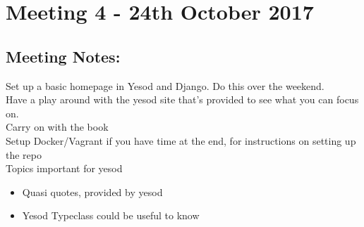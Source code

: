 \section{Meeting 4 - 24th October 2017}

\subsection{Meeting Notes:}

Set up a basic homepage in Yesod and Django. Do this over the weekend.\\
Have a play around with the yesod site that’s provided to see what you can focus on.\\
Carry on with the book\\
Setup Docker/Vagrant if you have time at the end, for instructions on setting up the repo\\
Topics important for yesod
\begin{itemize}
  \item Quasi quotes, provided by yesod
  \item Yesod Typeclass could be useful to know
\end{itemize}
